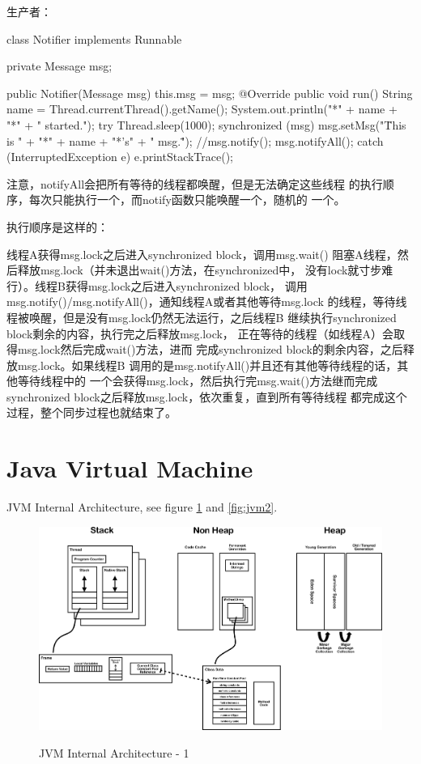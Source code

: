 \documentclass[a4paper,11pt]{article}
\begin{document}
生产者：

\begin{javacode}
class Notifier implements Runnable {
  private Message msg;

  public Notifier(Message msg) {
    this.msg = msg;
  }
  @Override
  public void run() {
    String name = Thread.currentThread().getName();
    System.out.println("*" + name + "*" + " started.");
    try {
      Thread.sleep(1000);
      synchronized (msg) {
        msg.setMsg("\"This is " + "*" + name + "*'s" + " msg.\"");
        //msg.notify();
        msg.notifyAll();
      }
    } catch (InterruptedException e) {
      e.printStackTrace();
    }
  }
}
\end{javacode}

注意，notifyAll会把所有等待的线程都唤醒，但是无法确定这些线程
的执行顺序，每次只能执行一个，而notify函数只能唤醒一个，随机的
一个。

执行顺序是这样的：

线程A获得msg.lock之后进入synchronized block，调用msg.wait()
阻塞A线程，然后释放msg.lock（并未退出wait()方法，在synchronized中，
没有lock就寸步难行）。线程B获得msg.lock之后进入synchronized block，
调用msg.notify()/msg.notifyAll()，通知线程A或者其他等待msg.lock
的线程，等待线程被唤醒，但是没有msg.lock仍然无法运行，之后线程B
继续执行synchronized block剩余的内容，执行完之后释放msg.lock，
正在等待的线程（如线程A）会取得msg.lock然后完成wait()方法，进而
完成synchronized block的剩余内容，之后释放msg.lock。如果线程B
调用的是msg.notifyAll()并且还有其他等待线程的话，其他等待线程中的
一个会获得msg.lock，然后执行完msg.wait()方法继而完成
synchronized block之后释放msg.lock，依次重复，直到所有等待线程
都完成这个过程，整个同步过程也就结束了。


\part[JVM]{Java Virtual Machine}
JVM Internal Architecture, see figure \ref{fig:jvm} and \ref{fig:jvm2}.
\begin{figure}
  \centering
  \includegraphics[width=\textwidth]{picturedir/JVMInternalArchitecture.png}\\
  \caption{JVM Internal Architecture - 1}\label{fig:jvm}
\end{figure}
\end{document}
